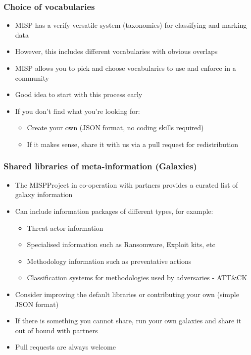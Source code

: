 \begin{frame}
\frametitle{Choice of vocabularies}
\begin{itemize}
	\item MISP has a verify versatile system (taxonomies) for classifying and marking data
	\item However, this includes different vocabularies with obvious overlaps
	\item MISP allows you to pick and choose vocabularies to use and enforce in a community
	\item Good idea to start with this process early
	\item If you don't find what you're looking for:
	\begin{itemize}
		\item Create your own (JSON format, no coding skills required)
		\item If it makes sense, share it with us via a pull request for redistribution
	\end{itemize}
\end{itemize}
\end{frame}


\begin{frame}
\frametitle{Shared libraries of meta-information (Galaxies)}
\begin{itemize}
	\item The MISPProject in co-operation with partners provides a curated list of galaxy information
	\item Can include information packages of different types, for example:
	\begin{itemize}
		\item Threat actor information
		\item Specialised information such as Ransomware, Exploit kits, etc
		\item Methodology information such as preventative actions
		\item Classification systems for methodologies used by adversaries - ATT\&CK
	\end{itemize}
	\item Consider improving the default libraries or contributing your own (simple JSON format)
	\item If there is something you cannot share, run your own galaxies and share it out of bound with partners
	\item Pull requests are always welcome
\end{itemize}
\end{frame}


